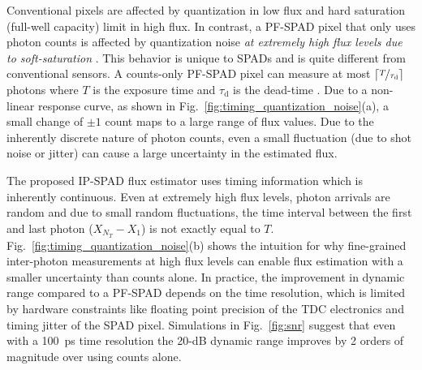 
\smallskip
{}
Conventional pixels are affected by quantization in low flux and hard
saturation (full-well capacity) limit in high flux.  In contrast, a PF-SPAD
pixel that only uses photon counts is affected by quantization noise \emph{at
extremely high flux levels due to soft-saturation} \cite{ingle2019high}. This
behavior is unique to SPADs and is quite different from conventional sensors. A
counts-only PF-SPAD pixel can measure at most $\lceil
\nicefrac{T}{\tau_\text{d}}\rceil$ photons where $T$ is the exposure time and
$\tau_\text{d}$ is the dead-time \cite{ingle2019high}.  Due to a non-linear
response curve, as shown in Fig.~\ref{fig:timing_quantization_noise}(a), a
small change of $\pm 1$ count maps to a large range of flux values. Due to the
inherently discrete nature of photon counts, even a small fluctuation (due to
shot noise or jitter) can cause a large uncertainty in the estimated flux.


The proposed IP-SPAD flux estimator uses timing information which is inherently
continuous.  Even at extremely high flux levels, photon arrivals are random and
due to small random fluctuations, the time interval between the first and last
photon ($X_{N_T}-X_1$) is not exactly equal to $T$.
Fig.~\ref{fig:timing_quantization_noise}(b) shows the intuition for why
fine-grained inter-photon measurements at high flux levels can enable flux
estimation with a smaller uncertainty than counts alone. In practice, the
improvement in dynamic range compared to a PF-SPAD depends on the time
resolution, which is limited by hardware constraints like floating point
precision of the TDC electronics and timing jitter of the SPAD pixel.
Simulations in Fig.~\ref{fig:snr} suggest that even with a \SI{100}{\ps} time
resolution the 20-dB dynamic range improves by 2 orders of magnitude over using
counts alone.

